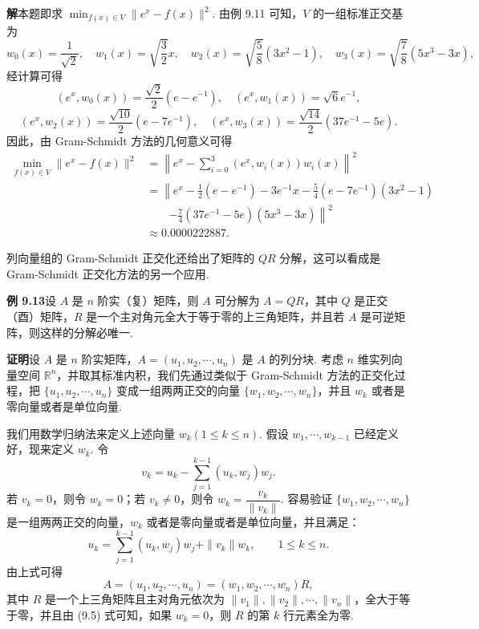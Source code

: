 \documentclass[UTF8,12pt,a4paper,fontset=fandol]{ctexart}
\begin{document}
\noindent\textbf{解}\quad 本题即求 $\min_{f(x)\in V}\|e^x-f(x)\|^2$. 由例 9.11 可知，$V$ 的一组标准正交基为
\[
w_0(x)=\frac1{\sqrt2},\quad w_1(x)=\sqrt{\frac32}x,\quad
w_2(x)=\sqrt{\frac58}(3x^2-1),\quad w_3(x)=\sqrt{\frac78}(5x^3-3x),
\]
经计算可得
\[
(e^x,w_0(x))=\frac{\sqrt2}{2}(e-e^{-1}),\quad
(e^x,w_1(x))=\sqrt6e^{-1},
\]
\[
(e^x,w_2(x))=\frac{\sqrt{10}}2(e-7e^{-1}),\quad
(e^x,w_3(x))=\frac{\sqrt{14}}2(37e^{-1}-5e).
\]
因此，由 Gram-Schmidt 方法的几何意义可得
\[
\begin{aligned}
\min_{f(x)\in V}\|e^x-f(x)\|^2
&=\left\|e^x-\sum_{i=0}^3(e^x,w_i(x))w_i(x)\right\|^2\\
&=\left\|e^x-\frac12(e-e^{-1})-3e^{-1}x
-\frac54(e-7e^{-1})(3x^2-1)\right.\\
&\qquad\left.-\frac74(37e^{-1}-5e)(5x^3-3x)\right\|^2\\
&\approx 0.0000222887.
\end{aligned}
\]

列向量组的 Gram-Schmidt 正交化还给出了矩阵的 $QR$ 分解，这可以看成是 Gram-Schmidt 正交化方法的另一个应用.

\noindent\textbf{例 9.13}\quad 设 $A$ 是 $n$ 阶实（复）矩阵，则 $A$ 可分解为 $A=QR$，其中 $Q$ 是正交（酉）矩阵，$R$ 是一个主对角元全大于等于零的上三角矩阵，并且若 $A$ 是可逆矩阵，则这样的分解必唯一.

\noindent\textbf{证明}\quad 设 $A$ 是 $n$ 阶实矩阵，$A=(u_1,u_2,\cdots,u_n)$ 是 $A$ 的列分块. 考虑 $n$ 维实列向量空间 $\mathbb{R}^n$，并取其标准内积，我们先通过类似于 Gram-Schmidt 方法的正交化过程，把 $\{u_1,u_2,\cdots,u_n\}$ 变成一组两两正交的向量 $\{w_1,w_2,\cdots,w_n\}$，并且 $w_k$ 或者是零向量或者是单位向量.

我们用数学归纳法来定义上述向量 $w_k(1\le k\le n)$. 假设 $w_1,\cdots,w_{k-1}$ 已经定义好，现来定义 $w_k$. 令
\[
v_k=u_k-\sum_{j=1}^{k-1}(u_k,w_j)w_j.
\]
若 $v_k=0$，则令 $w_k=0$；若 $v_k\ne 0$，则令 $w_k=\dfrac{v_k}{\|v_k\|}$. 容易验证 $\{w_1,w_2,\cdots,w_n\}$ 是一组两两正交的向量，$w_k$ 或者是零向量或者是单位向量，并且满足：
\begin{equation}
u_k=\sum_{j=1}^{k-1}(u_k,w_j)w_j+\|v_k\|w_k,\qquad 1\le k\le n.
\tag{9.5}
\end{equation}
由上式可得
\begin{equation}
A=(u_1,u_2,\cdots,u_n)=(w_1,w_2,\cdots,w_n)R,
\tag{9.6}
\end{equation}
其中 $R$ 是一个上三角矩阵且主对角元依次为 $\|v_1\|,\|v_2\|,\cdots,\|v_n\|$，全大于等于零，并且由 (9.5) 式可知，如果 $w_k=0$，则 $R$ 的第 $k$ 行元素全为零.
\end{document}

